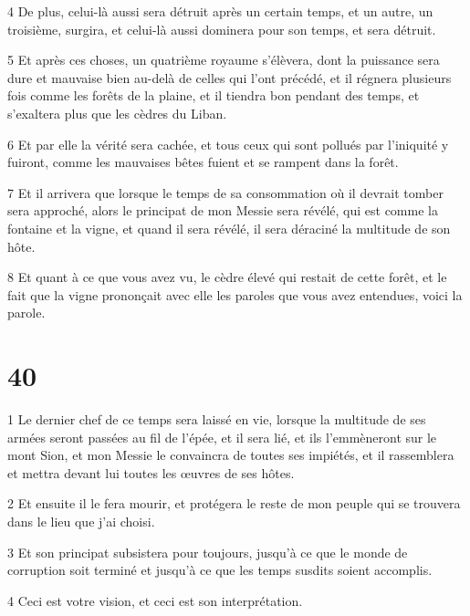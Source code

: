 \par 4 De plus, celui-là aussi sera détruit après un certain temps, et un autre, un troisième, surgira, et celui-là aussi dominera pour son temps, et sera détruit.

\par 5 Et après ces choses, un quatrième royaume s'élèvera, dont la puissance sera dure et mauvaise bien au-delà de celles qui l'ont précédé, et il régnera plusieurs fois comme les forêts de la plaine, et il tiendra bon pendant des temps, et s'exaltera plus que les cèdres du Liban.

\par 6 Et par elle la vérité sera cachée, et tous ceux qui sont pollués par l'iniquité y fuiront, comme les mauvaises bêtes fuient et se rampent dans la forêt.

\par 7 Et il arrivera que lorsque le temps de sa consommation où il devrait tomber sera approché, alors le principat de mon Messie sera révélé, qui est comme la fontaine et la vigne, et quand il sera révélé, il sera déraciné la multitude de son hôte.

\par 8 Et quant à ce que vous avez vu, le cèdre élevé qui restait de cette forêt, et le fait que la vigne prononçait avec elle les paroles que vous avez entendues, voici la parole.

\chapter{40}

\par 1 Le dernier chef de ce temps sera laissé en vie, lorsque la multitude de ses armées seront passées au fil de l'épée, et il sera lié, et ils l'emmèneront sur le mont Sion, et mon Messie le convaincra de toutes ses impiétés, et il rassemblera et mettra devant lui toutes les œuvres de ses hôtes.

\par 2 Et ensuite il le fera mourir, et protégera le reste de mon peuple qui se trouvera dans le lieu que j'ai choisi.

\par 3 Et son principat subsistera pour toujours, jusqu'à ce que le monde de corruption soit terminé et jusqu'à ce que les temps susdits soient accomplis.

\par 4 Ceci est votre vision, et ceci est son interprétation.


